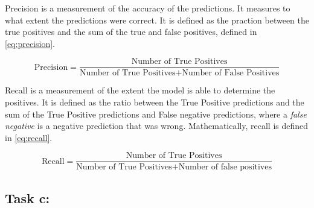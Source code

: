 \documentclass{article}
\begin{document}
Precision is a measurement of the accuracy of the predictions. It measures to what extent the predictions were correct. It is defined as the praction between the true positives and the sum of the true and false positives, defined in \autoref{eq:precision}.

\begin{equation}
    \text{Precision} = \frac{\text{Number of True Positives}}{\text{Number of True Positives} + \text{Number of False Positives}}
    \label{eq:precision}
\end{equation}

Recall is a measurement of the extent the model is able to determine the positives. It is defined as the ratio between the True Positive predictions and the sum of the True Positive predictions and False negative predictions, where a \textit{false negative} is a negative prediction that was wrong. Mathematically, recall is defined in \autoref{eq:recall}.

\begin{equation}
    \text{Recall} = \frac{\text{Number of True Positives}}{\text{Number of True Positives} + \text{Number of false positives}}
    \label{eq:recall}
\end{equation}

\subsection{Task c:}
\end{document}
